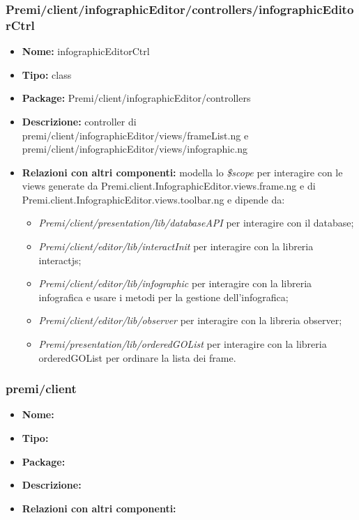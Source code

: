 \subsubsection{Premi/client/infographicEditor/controllers/infographicEditorCtrl}
\begin{itemize}
  \item[] \textbf{Nome:} infographicEditorCtrl
  \item[] \textbf{Tipo:} class
  \item[] \textbf{Package:} Premi/client/infographicEditor/controllers
  \item[] \textbf{Descrizione:} controller di premi/client/infographicEditor/views/frameList.ng e premi/client/infographicEditor/views/infographic.ng
  \item[] \textbf{Relazioni con altri componenti:} modella lo \textit{\$scope} per interagire con le views generate da Premi.client.InfographicEditor.views.frame.ng e di Premi.client.InfographicEditor.views.toolbar.ng e dipende da: 
  \begin{itemize}  
  \item[] \textit{Premi/client/presentation/lib/databaseAPI} per interagire con il database;
  \item[] \textit{Premi/client/editor/lib/interactInit} per interagire con la libreria interactjs;
  \item[] \textit{Premi/client/editor/lib/infographic} per interagire con la libreria infografica e usare i metodi per la gestione dell'infografica;
  \item[] \textit{Premi/client/editor/lib/observer} per interagire con la libreria observer;
  \item[] \textit{Premi/presentation/lib/orderedGOList} per interagire con la libreria orderedGOList per ordinare la lista dei frame. 
  \end{itemize}
\end{itemize}



\subsubsection{premi/client}
\begin{itemize}
  \item[] \textbf{Nome:}
  \item[] \textbf{Tipo:}
  \item[] \textbf{Package:} 
  \item[] \textbf{Descrizione:} 
  \item[] \textbf{Relazioni con altri componenti:} 
\end{itemize}

